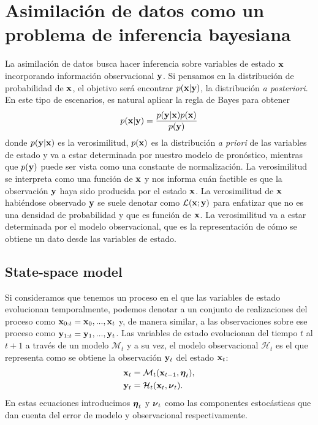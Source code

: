 \section{Asimilación de datos como un problema de inferencia bayesiana}

La asimilación de datos busca hacer inferencia sobre variables de estado $\mathbf{x}$ incorporando información observacional $\mathbf{y}$. Si pensamos en la distribución de probabilidad de $\mathbf{x}$, el objetivo será encontrar $p(\mathbf{x} | \mathbf{y})$, la distribución \textit{a posteriori}. En este tipo de escenarios, es natural aplicar la regla de Bayes para obtener
\begin{align*}
    p(\mathbf{x} | \mathbf{y}) = \frac{p(\mathbf{y} | \mathbf{x})p(\mathbf{x})}{p(\mathbf{y})}
\end{align*}
donde $p(\mathbf{y} | \mathbf{x})$ es la verosimilitud, $p(\mathbf{x})$ es la distribución \textit{a priori} de las variables de estado y va a estar determinada por nuestro modelo de pronóstico, mientras que $p(\mathbf{y})$ puede ser vista como una constante de normalización. La verosimilitud se interpreta como una función de $\mathbf{x}$ y nos informa cuán factible es que la observación $\mathbf{y}$ haya sido producida por el estado $\mathbf{x}$. La verosimilitud de $\mathbf{x}$ habiéndose observado $\mathbf{y}$ se suele denotar como $\mathcal{L}(\mathbf{x} ; \mathbf{y})$ para enfatizar que no es una densidad de probabilidad y que es función de $\mathbf{x}$. La verosimilitud va a estar determinada por el modelo observacional, que es la representación de cómo se obtiene un dato desde las variables de estado.

\subsection{State-space model}

Si consideramos que tenemos un proceso en el que las variables de estado evolucionan temporalmente, podemos denotar a un conjunto de realizaciones del proceso como $\mathbf{x}_{0:t} = \mathbf{x}_0, ..., \mathbf{x}_t$ y, de manera similar, a las observaciones sobre ese proceso como $\mathbf{y}_{1:t} = \mathbf{y}_1, ..., \mathbf{y}_t$. Las variables de estado evolucionan del tiempo $t$ al $t+1$ a través de un modelo $\mathcal{M}_t$ y a su vez, el modelo observacional $\mathcal{H}_t$ es el que representa como se obtiene la observación $\mathbf{y}_t$ del estado $\mathbf{x}_t$: 
\begin{align}
    \mathbf{x}_t &= \mathcal M_{t} (\mathbf{x}_{t-1}, \mbox{\boldmath$ \eta $}_t), \label{eq:transition} \\
    \mathbf{y}_t &= \mathcal H_{t} (\mathbf{x}_t, \mbox{\boldmath$ \nu $}_t). \label{eq:observation}
\end{align}
En estas ecuaciones introducimos $\mbox{\boldmath$ \eta $}_t$ y $\mbox{\boldmath$ \nu $}_t$ como las componentes estocásticas que dan cuenta del error de modelo y observacional respectivamente.

